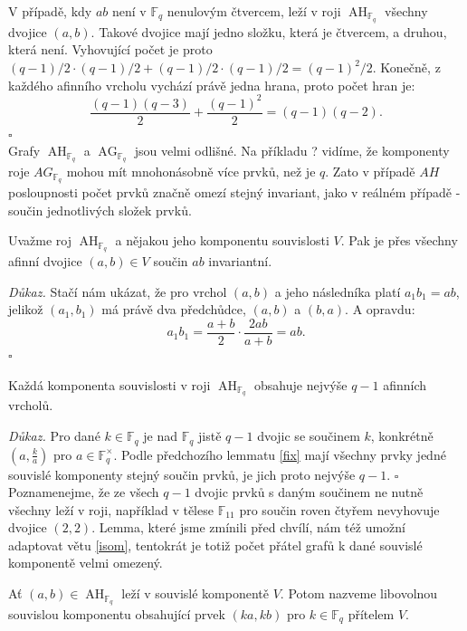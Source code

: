 \documentclass[12pt]{report}
\DeclareMathOperator{\AG}{AG}
\DeclareMathOperator{\AH}{AH}
\begin{document}
V případě, kdy $ab$ není v $\mathbb{F}_q$ nenulovým čtvercem, leží v roji $\AH_{\mathbb{F}_q}$ všechny dvojice $(a,b)$. Takové dvojice mají jedno složku, která je čtvercem, a druhou, která není. Vyhovující počet je proto $(q-1)/2 \cdot (q-1)/2 + (q-1)/2 \cdot (q-1)/2 = (q-1)^2/2$. Konečně, z každého afinního vrcholu vychází právě jedna hrana, proto počet hran je:
$$\frac{(q-1)(q-3)}{2}+\frac{(q-1)^2}{2} = (q-1)(q-2).$$  \hfill $\square$\\



Grafy $\AH_{\mathbb{F}_q}$ a $\AG_{\mathbb{F}_q}$ jsou velmi odlišné. Na příkladu ? vidíme, že komponenty roje $AG_{\mathbb{F}_q}$ mohou mít mnohonásobně více prvků, než je $q$. Zato v případě $AH$ posloupnosti počet prvků značně omezí stejný invariant, jako v reálném případě - součin jednotlivých složek prvků. 

\begin{lemma}\label{fix}
Uvažme roj $\AH_{\mathbb{F}_q}$ a nějakou jeho komponentu souvislosti $V$. Pak je přes všechny afinní dvojice $(a,b) \in V$ součin $ab$ invariantní.
\end{lemma}
\noindent \textit{Důkaz.} Stačí nám ukázat, že pro vrchol $(a,b)$ a jeho následníka platí $a_1 b_1 = ab$, jelikož $(a_1,b_1)$ má právě dva předchůdce, $(a,b)$ a $(b,a)$. A opravdu:
\begin{equation*}
a_1 b_1 = \frac{a+b}{2} \cdot \frac{2ab}{a+b} = ab.
\end{equation*} 
\hfill $\square$\\

\begin{dusledek}\label{fixab}
Každá komponenta souvislosti v roji $\AH_{\mathbb{F}_q}$ obsahuje nejvýše $q-1$ afinních vrcholů.
\end{dusledek}
\noindent \textit{Důkaz.} Pro dané $k \in \mathbb{F}_q$ je nad $\mathbb{F}_q$ jistě $q-1$ dvojic se součinem $k$, konkrétně $\left(a, \frac{k}{a}\right)$ pro $a \in \mathbb{F}_q ^{\times}$. Podle předchozího lemmatu \ref{fix} mají všechny prvky jedné souvislé komponenty stejný součin prvků, je jich proto nejvýše $q-1$. \hfill $\square$\\

Poznamenejme, že ze všech $q-1$ dvojic prvků s daným součinem ne nutně všechny leží v roji, například v tělese $\mathbb{F}_{11}$ pro součin roven čtyřem nevyhovuje dvojice $(2,2)$. Lemma, které jsme zmínili před chvílí, nám též umožní adaptovat větu \ref{isom}, tentokrát je totiž počet přátel grafů k dané souvislé komponentě velmi omezený.
\begin{definice}
Ať $(a,b) \in \AH_{\mathbb{F}_q}$ leží v souvislé komponentě $V$. Potom nazveme libovolnou souvislou komponentu obsahující prvek $(ka,kb)$ pro $k \in \mathbb{F}_q$ přítelem $V$.
\end{definice}
\end{document}
